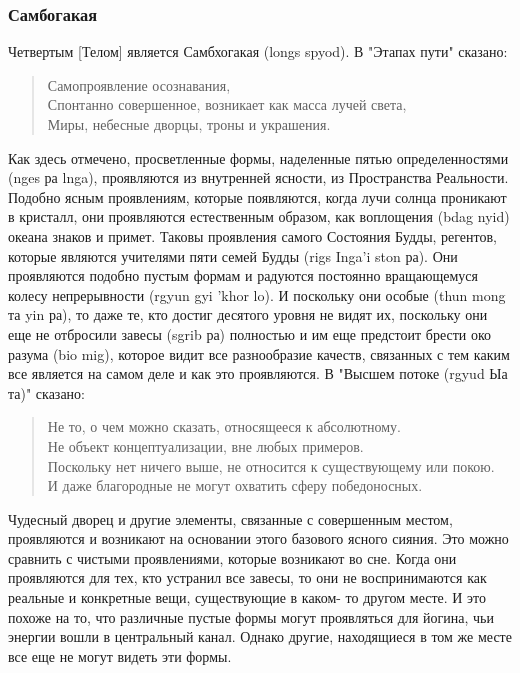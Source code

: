 \subsubsection{Самбогакая}

Четвертым [Телом] является Самбхогакая (longs spyod). В "Этапах пути" сказано:

\begin{verse}
Самопроявление осознавания,\\
Спонтанно совершенное, возникает как масса лучей света,\\
Миры, небесные дворцы, троны и украшения.
\end{verse}

Как здесь отмечено, просветленные формы, наделенные пятью определенностями
(nges ра lnga), проявляются из внутренней ясности, из Пространства Реальности. Подобно
ясным проявлениям, которые появляются, когда лучи солнца проникают в кристалл, они
проявляются естественным образом, как воплощения (bdag nyid) океана знаков и примет.
Таковы проявления самого Состояния Будды, регентов, которые являются учителями пяти
семей Будды (rigs Inga’i ston ра). Они проявляются подобно пустым формам и радуются
постоянно вращающемуся колесу непрерывности (rgyun gyi 'khor lo). И поскольку они
особые (thun mong та yin ра), то даже те, кто достиг десятого уровня не видят их, поскольку
они еще не отбросили завесы (sgrib ра) полностью и им еще предстоит брести око разума
(bio mig), которое видит все разнообразие качеств, связанных с тем каким все является на
самом деле и как это проявляются. В "Высшем потоке (rgyud Ыа та)" сказано:

\begin{verse}
Не то, о чем можно сказать, относящееся к абсолютному.\\
Не объект концептуализации, вне любых примеров.\\
Поскольку нет ничего выше, не относится к существующему или покою.\\
И даже благородные не могут охватить сферу победоносных.
\end{verse}

Чудесный дворец и другие элементы, связанные с совершенным местом, проявляются
и возникают на основании этого базового ясного сияния. Это можно сравнить с чистыми
проявлениями, которые возникают во сне. Когда они проявляются для тех, кто устранил все
завесы, то они не воспринимаются как реальные и конкретные вещи, существующие в каком-
то другом месте. И это похоже на то, что различные пустые формы могут проявляться для
йогина, чьи энергии вошли в центральный канал. Однако другие, находящиеся в том же
месте все еще не могут видеть эти формы.

